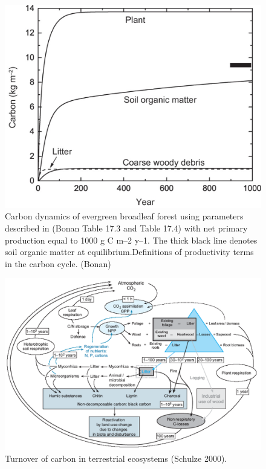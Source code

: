 \documentclass[
  12pt,
  oneside]{book}
\begin{document}
\begin{figure}

{\centering \includegraphics[width=0.8\linewidth]{figures/chap5/f55_casa_result} 

}

\caption{Carbon dynamics of evergreen broadleaf forest using parameters described in (Bonan Table 17.3 and Table 17.4) with net primary production equal to 1000 g C m–2 y–1. The thick black line denotes soil organic matter at equilibrium.Definitions of productivity terms in the carbon cycle. (Bonan)}\label{fig:f55}
\end{figure}

\begin{figure}

{\centering \includegraphics[width=0.8\linewidth]{figures/chap5/f56_turnover} 

}

\caption{Turnover of carbon in terrestrial ecosystems (Schulze 2000).}\label{fig:f56}
\end{figure}
\end{document}
